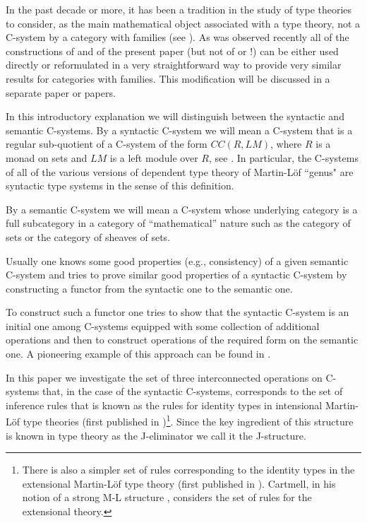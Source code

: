 \documentclass[12pt]{article}
\numberwithin{equation}{section}
\newcommand{\toCC}{CC} %
\begin{document}
In the past decade or more, it has been a tradition in the study of type
theories to consider, as the main mathematical object associated with a type
theory, not a C-system by a category with families (see \cite{Dybjer}). As was
observed recently all of the constructions of \cite{Cfromauniverse,fromunivwithPi}
and of the present paper (but not of \cite{Csubsystems}
or \cite{Cofamodule}!) can be either used directly or reformulated in a very
straightforward way to provide very similar results for categories with
families. This modification will be discussed in a separate paper or papers.

In this introductory explanation we will distinguish between the syntactic and
semantic C-systems. By a syntactic C-system we will mean a C-system that is a
regular sub-quotient of a C-system of the form $\toCC(R,LM)$, where $R$ is a monad
on sets and $LM$ is a left module over $R$, see \cite{Cofamodule,Csubsystems}.
In particular, the C-systems of all of the various versions
of dependent type theory of Martin-L\"of ``genus" are syntactic type systems in
the sense of this definition.

By a semantic C-system we will mean a C-system whose underlying category is a
full subcategory in a category of ``mathematical'' nature such as the category
of sets or the category of sheaves of sets.

Usually one knows some good properties (e.g., consistency) of a given semantic
C-system and tries to prove similar good properties of a syntactic C-system by
constructing a functor from the syntactic one to the semantic one.

To construct such a functor one tries to show that the syntactic C-system is an
initial one among C-systems equipped with some collection of additional
operations and then to construct operations of the required form on the
semantic one. A pioneering example of this approach can be found in
\cite{Streicher}.

In this paper we investigate the set of three interconnected operations on
C-systems that, in the case of the syntactic C-systems, corresponds to the set
of inference rules that is known as the rules for identity types in intensional
Martin-L\"of type theories (first published in \cite{MLTT73})\footnote{There is
  also a simpler set of rules corresponding to the identity types in the
  extensional Martin-L\"of type theory (first published in
  \cite{MLTT79}). Cartmell, in his notion of a strong M-L structure
  \cite[p.3.36]{Cartmell0}, considers the set of rules for the extensional
  theory.}. Since the key ingredient of this structure is known in type theory
as the J-eliminator we call it the J-structure.
\end{document}
